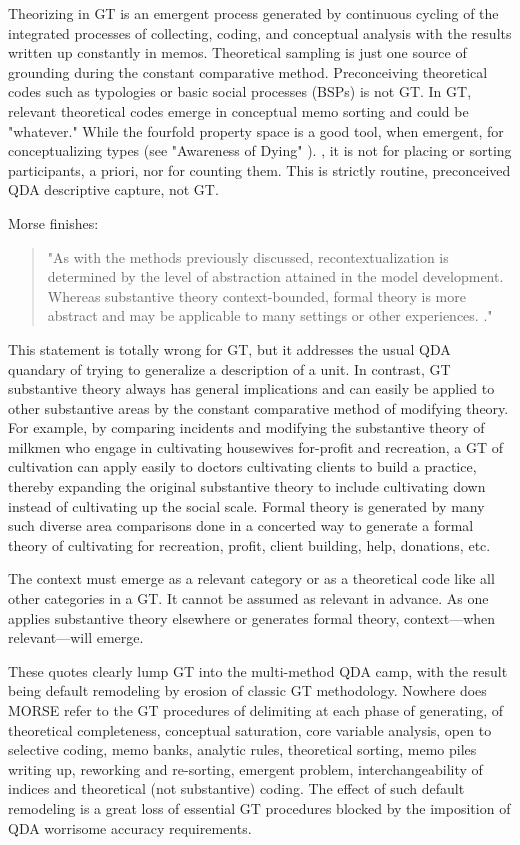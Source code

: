 Theorizing in GT is an emergent process generated by continuous cycling of the integrated processes of collecting, coding, and conceptual analysis with the results written up constantly in memos. 
Theoretical sampling is just one source of grounding during the constant comparative method. 
Preconceiving theoretical codes such as typologies or basic social processes (BSPs) is not GT. 
In GT, relevant theoretical codes emerge in conceptual memo sorting and could be "whatever." 
While the fourfold property space is a good tool, when emergent, for conceptualizing types 
(see "Awareness of Dying" \citep{book.glaser65}).
, it is not for placing or sorting participants, a priori, nor for counting them. 
This is strictly routine, preconceived QDA descriptive capture, not GT.

Morse finishes:

\begin{quote}
"As with the methods previously discussed, recontextualization is determined by the level of abstraction attained in the model development. 
Whereas substantive theory context-bounded, formal theory is more abstract and may be applicable to many settings or other experiences.
\citep[p. 39]{incollection.morse94}."
\end{quote}

This statement is totally wrong for GT, but it addresses the usual QDA quandary of trying to generalize a description of a unit. 
In contrast, GT substantive theory always has general implications and can easily be applied to other substantive areas by the constant comparative method of modifying theory. 
For example, by comparing incidents and modifying the substantive theory of milkmen who engage in cultivating housewives for-profit and recreation, a GT of cultivation can apply easily to doctors cultivating clients to build a practice, thereby expanding the original substantive theory to include cultivating down instead of cultivating up the social scale. 
Formal theory is generated by many such diverse area comparisons done in a concerted way to generate a formal theory of cultivating for recreation, profit, client building, help, donations, etc.

The context must emerge as a relevant category or as a theoretical code like all other categories in a GT. 
It cannot be assumed as relevant in advance. 
As one applies substantive theory elsewhere or generates formal theory, context—when relevant—will emerge.

These quotes clearly lump GT into the multi-method QDA camp, with the result being default remodeling by erosion of classic GT methodology. 
Nowhere does MORSE refer to the GT procedures of delimiting at each phase of generating, of theoretical completeness, conceptual saturation, core variable analysis, open to selective coding, memo banks, analytic rules, theoretical sorting, memo piles writing up, reworking and re-sorting, emergent problem, interchangeability of
indices and theoretical (not substantive) coding. 
The effect of such default remodeling is a great loss of essential GT procedures blocked by the imposition of QDA worrisome accuracy requirements.

